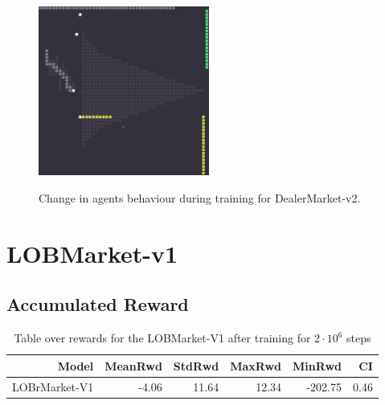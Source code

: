 \documentclass{kththesis}
\theoremstyle{definition}
\begin{document}
\begin{figure}[H]
{\includegraphics[width=0.5\textwidth]{best_2006eps.jpg}
\label{fig:svd4}}
\caption{Change in agents behaviour during training for DealerMarket-v2.}
\label{fig:vizd1}
\end{figure}

\section{LOBMarket-v1}

\subsection*{Accumulated Reward}

%		

\begin{table}[H]
\centering
\begin{tabular}{rrrrrr}
  \hline
 \textbf{Model} & \textbf{MeanRwd} & \textbf{StdRwd} & \textbf{MaxRwd} & \textbf{MinRwd} & \textbf{CI} \\ 
  \hline
LOBrMarket-V1 & -4.06 & 11.64 & 12.34 & -202.75 & 0.46 \\
   \hline
\end{tabular}
\label{tab:dm3}
\caption{Table over rewards for the LOBMarket-V1 after training for $2\cdot10^6$ steps}
\end{table}
\end{document}
